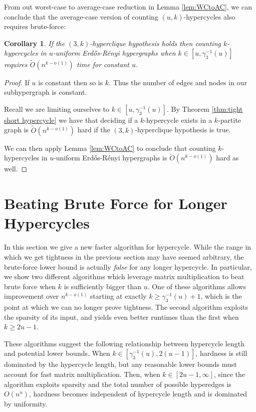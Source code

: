 \documentclass[11pt,letterpaper,pdftex]{article}
\newtheorem{corollary}[theorem]{Corollary}
\begin{document}
From out worst-case to average-case reduction in Lemma \ref{lem:WCtoAC}, we can conclude that the average-case version of counting $(u,k)$-hypercycles also requires brute-force:

\begin{corollary}
    If the $(3,k)$-hyperclique hypothesis holds then counting $k$-hypercycles in $u$-uniform Erd{\H{o}}s-R{\'{e}}nyi hypergraphs when $k \in [u, \gamma_3^{-1}(u)]$ requires $\tilde{O}(n^{k-o(1)})$ time for constant $u$.
\end{corollary}
\begin{proof}
    If $u$ is constant then so is $k$. Thus the number of edges and nodes in our subhypergraph is constant. 

    Recall we are limiting ourselves to $k \in [u, \gamma_3^{-1}(u)]$.
    By Theorem \ref{thm:tight short hypercycle} we have that deciding if a $k$-hypercycle exists in a $k$-partite graph is $\tilde{O}(n^{k-o(1)})$ hard if the $(3,k)$-hyperclique hypothesis is true. 

    We can then apply Lemma \ref{lem:WCtoAC} to conclude that counting $k$-hypercycles in $u$-uniform Erd{\H{o}}s-R{\'{e}}nyi hypergraphs is $\tilde{O}(n^{k-o(1)})$ hard as well.
    
\end{proof} 
\section{Beating Brute Force for Longer Hypercycles}
\label{sec:ub_unweighted}

In this section we give a new faster algorithm for hypercycle. 
While the range in which we get tightness in the previous section may have seemed arbitrary, the brute-force lower bound is actually \textit{false} for any longer hypercycle.
In particular, we show two different algorithms which leverage matrix multiplication to beat brute force when $k$ is sufficiently bigger than $u$.
One of these algorithms allows improvement over $n^{k-o(1)}$ starting at exactly $k \geq \gamma_3^{-1}(u)+1$, which is the point at which we can no longer prove tightness. 
The second algorithm exploits the sparsity of its input, and yields even better runtimes than the first when $k \geq 2u-1$.

These algorithms suggest the following relationship between hypercycle length and potential lower bounds.
When $k \in [\gamma_3^{-1}(u),2(u-1)]$, hardness is still dominated by the hypercycle length, but any reasonable lower bounds must account for fast matrix multiplication.
Then, when $k \in [2u-1, \infty]$, since the algorithm exploits sparsity and the total number of possible hyperedges is $O(n^u)$, hardness becomes independent of hypercycle length and is dominated by uniformity. 
\end{document}
